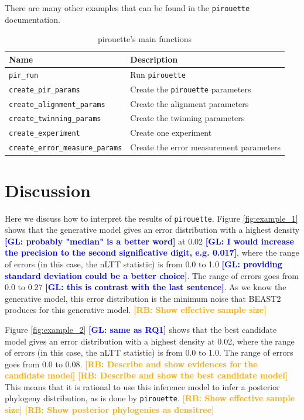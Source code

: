 \documentclass{article}
\newcommand{\giovanni}[1]{\textcolor{blue}{\textbf{[GL: #1]}}}
\newcommand{\richel}[1]{\textcolor{orange}{\textbf{[RB: #1]}}}
\begin{document}
There are many other examples that can be found in the \verb;pirouette; 
documentation.

\begin{table}[h]
\centering
\begin{tabular}{ | l | l | }
\hline
\textbf{Name} & \textbf{Description} \\
\hline
\verb;pir_run; & Run \verb;pirouette; \\
\verb;create_pir_params; & Create the \verb;pirouette; parameters \\
\hline
\verb;create_alignment_params; & Create the alignment parameters \\
\verb;create_twinning_params; & Create the twinning parameters \\
\verb;create_experiment; & Create one experiment \\
\verb;create_error_measure_params; & Create the error measurement parameters \\
\hline
\end{tabular}
\caption{pirouette's main functions}
\label{tab:functions}
\end{table}

\section{Discussion}

Here we discuss how to interpret the results of \verb;pirouette;.
Figure \ref{fig:example_1} shows that the generative model 
gives an error distribution with a highest density 
\giovanni{probably "median" is a better word}
at 0.02 
\giovanni{I would increase the precision to the second significative digit, e.g. 0.017},
where the range of errors (in this case, the nLTT statistic) is from 0.0 to 1.0 
\giovanni{providing standard deviation could be a better choice}.
The range of errors goes from 0.0 to 0.27 
\giovanni{this is contrast with the last sentence}. 
As we know the generative model, this error distribution is the minimum noise that BEAST2 produces for this generative model.
\richel{Show effective sample size}

Figure \ref{fig:example_2} \giovanni{same as RQ1} shows that the best candidate model gives an error distribution with a highest density at 0.02, where the range of errors (in this case, the nLTT statistic) is from 0.0 to 1.0. The range of errors goes from 0.0 to 0.08. 
\richel{Describe and show evidences for the candidate model}
\richel{Describe and show the best candidate model}
This means that it is rational to use this inference model to 
infer a posterior phylogeny distribution, 
as is done by \verb;pirouette;.
\richel{Show effective sample size}
\richel{Show posterior phylogenies as densitree}
\end{document}
